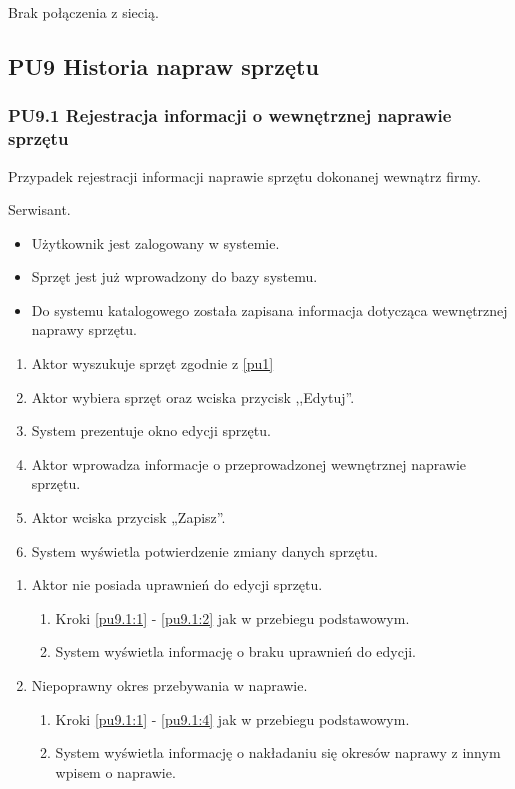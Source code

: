 Brak połączenia z siecią.

\subsection{PU9 Historia napraw sprzętu} \label{pu9}
\subsubsection{PU9.1 Rejestracja informacji o wewnętrznej naprawie sprzętu}
Przypadek rejestracji informacji naprawie sprzętu dokonanej wewnątrz firmy.

Serwisant.

\begin{itemize}
\item Użytkownik jest zalogowany w systemie.
\item Sprzęt jest już wprowadzony do bazy systemu.
\end{itemize}

\begin{itemize}
\item Do systemu katalogowego została zapisana informacja dotycząca wewnętrznej naprawy sprzętu.
\end{itemize}

\begin{enumerate}
	\item \label{pu9.1:1} Aktor wyszukuje sprzęt zgodnie z \ref{pu1}
	\item \label{pu9.1:2} Aktor wybiera sprzęt oraz wciska przycisk ,,Edytuj''.
	\item System prezentuje okno edycji sprzętu.
	\item \label{pu9.1:4} Aktor wprowadza informacje o przeprowadzonej wewnętrznej naprawie sprzętu.
	\item Aktor wciska przycisk „Zapisz”.
	\item System wyświetla potwierdzenie zmiany danych sprzętu.
\end{enumerate}

\begin{enumerate}
	\item Aktor nie posiada uprawnień do edycji sprzętu.
	\begin{enumerate}[label*=\arabic*.]
		\item Kroki \ref{pu9.1:1} - \ref{pu9.1:2} jak w przebiegu podstawowym.
		\item System wyświetla informację o braku uprawnień do edycji.
	\end{enumerate}
	\item Niepoprawny okres przebywania w naprawie.
	\begin{enumerate}[label*=\arabic*.]
		\item Kroki \ref{pu9.1:1} - \ref{pu9.1:4} jak w przebiegu podstawowym.
		\item System wyświetla informację o nakładaniu się okresów naprawy z innym wpisem o naprawie.
	\end{enumerate}
\end{enumerate}

